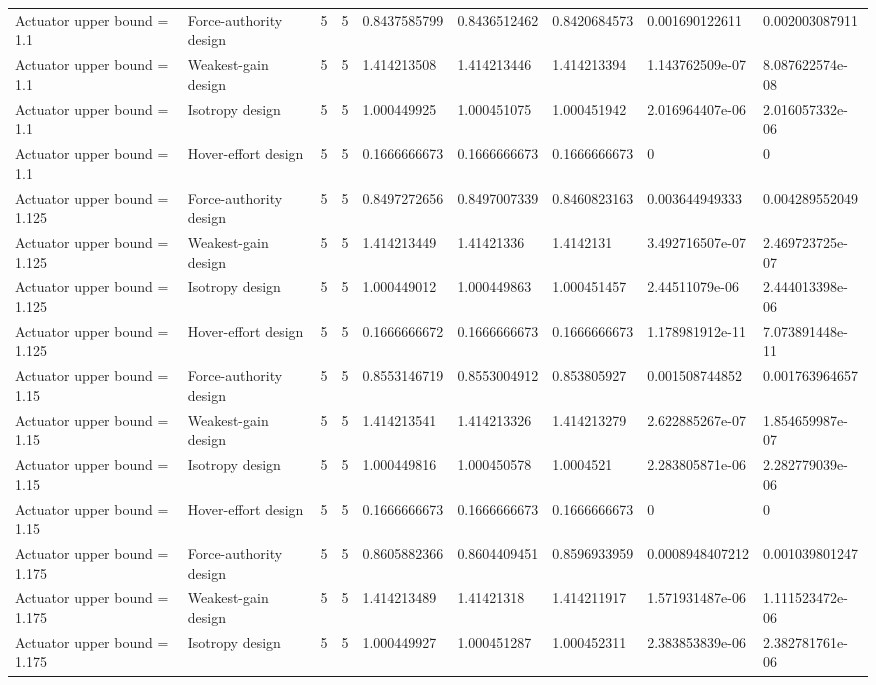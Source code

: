 \begin{tabular}{@{}lllllllll@{}}
Actuator upper bound = 1.1 & Force-authority design & 5 & 5 & 0.8437585799 & 0.8436512462 & 0.8420684573 & 0.001690122611 & 0.002003087911 \\
Actuator upper bound = 1.1 & Weakest-gain design & 5 & 5 & 1.414213508 & 1.414213446 & 1.414213394 & 1.143762509e-07 & 8.087622574e-08 \\
Actuator upper bound = 1.1 & Isotropy design & 5 & 5 & 1.000449925 & 1.000451075 & 1.000451942 & 2.016964407e-06 & 2.016057332e-06 \\
Actuator upper bound = 1.1 & Hover-effort design & 5 & 5 & 0.1666666673 & 0.1666666673 & 0.1666666673 & 0 & 0 \\
Actuator upper bound = 1.125 & Force-authority design & 5 & 5 & 0.8497272656 & 0.8497007339 & 0.8460823163 & 0.003644949333 & 0.004289552049 \\
Actuator upper bound = 1.125 & Weakest-gain design & 5 & 5 & 1.414213449 & 1.41421336 & 1.4142131 & 3.492716507e-07 & 2.469723725e-07 \\
Actuator upper bound = 1.125 & Isotropy design & 5 & 5 & 1.000449012 & 1.000449863 & 1.000451457 & 2.44511079e-06 & 2.444013398e-06 \\
Actuator upper bound = 1.125 & Hover-effort design & 5 & 5 & 0.1666666672 & 0.1666666673 & 0.1666666673 & 1.178981912e-11 & 7.073891448e-11 \\
Actuator upper bound = 1.15 & Force-authority design & 5 & 5 & 0.8553146719 & 0.8553004912 & 0.853805927 & 0.001508744852 & 0.001763964657 \\
Actuator upper bound = 1.15 & Weakest-gain design & 5 & 5 & 1.414213541 & 1.414213326 & 1.414213279 & 2.622885267e-07 & 1.854659987e-07 \\
Actuator upper bound = 1.15 & Isotropy design & 5 & 5 & 1.000449816 & 1.000450578 & 1.0004521 & 2.283805871e-06 & 2.282779039e-06 \\
Actuator upper bound = 1.15 & Hover-effort design & 5 & 5 & 0.1666666673 & 0.1666666673 & 0.1666666673 & 0 & 0 \\
Actuator upper bound = 1.175 & Force-authority design & 5 & 5 & 0.8605882366 & 0.8604409451 & 0.8596933959 & 0.0008948407212 & 0.001039801247 \\
Actuator upper bound = 1.175 & Weakest-gain design & 5 & 5 & 1.414213489 & 1.41421318 & 1.414211917 & 1.571931487e-06 & 1.111523472e-06 \\
Actuator upper bound = 1.175 & Isotropy design & 5 & 5 & 1.000449927 & 1.000451287 & 1.000452311 & 2.383853839e-06 & 2.382781761e-06 \\

\end{tabular}
